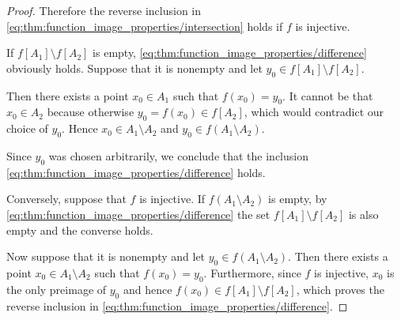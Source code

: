 \begin{proof}
  Therefore the reverse inclusion in \eqref{eq:thm:function_image_properties/intersection} holds if \( f \) is injective.

   If \( f[A_1] \setminus f[A_2] \) is empty, \eqref{eq:thm:function_image_properties/difference} obviously holds. Suppose that it is nonempty and let \( y_0 \in f[A_1] \setminus f[A_2] \).

  Then there exists a point \( x_0 \in A_1 \) such that \( f(x_0) = y_0 \). It cannot be that \( x_0 \in A_2 \) because otherwise \( y_0 = f(x_0) \in f[A_2] \), which would contradict our choice of \( y_0 \). Hence \( x_0 \in A_1 \setminus A_2 \) and \( y_0 \in f(A_1 \setminus A_2) \).

  Since \( y_0 \) was chosen arbitrarily, we conclude that the inclusion \eqref{eq:thm:function_image_properties/difference} holds.

  Conversely, suppose that \( f \) is injective. If \( f(A_1 \setminus A_2) \) is empty, by \eqref{eq:thm:function_image_properties/difference} the set \( f[A_1] \setminus f[A_2] \) is also empty and the converse holds.

  Now suppose that it is nonempty and let \( y_0 \in f(A_1 \setminus A_2) \). Then there exists a point \( x_0 \in A_1 \setminus A_2 \) such that \( f(x_0) = y_0 \). Furthermore, since \( f \) is injective, \( x_0 \) is the only preimage of \( y_0 \) and hence \( f(x_0) \in f[A_1] \setminus f[A_2] \), which proves the reverse inclusion in \eqref{eq:thm:function_image_properties/difference}.
\end{proof}

